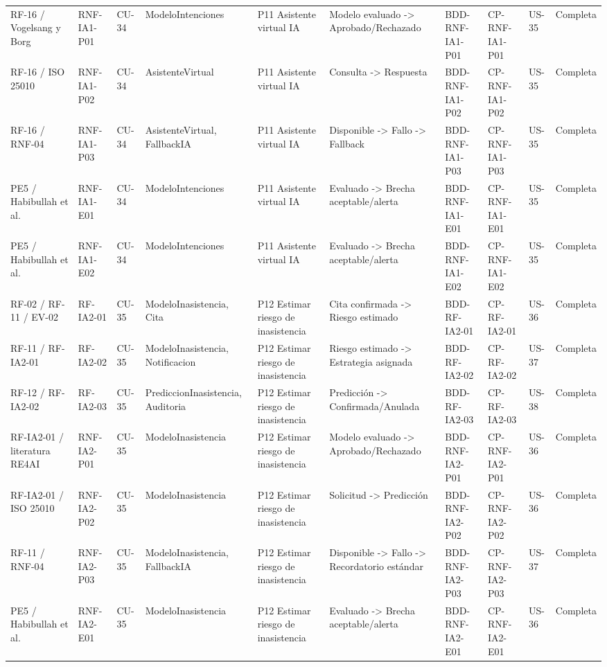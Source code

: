 \documentclass[11pt,a4paper]{article}
\begin{document}
\begin{appendices}
\begin{landscape}
\begin{longtable}{p{2.2cm}p{1.8cm}p{2cm}p{3cm}p{3cm}p{3cm}p{2cm}p{2cm}p{2cm}p{1.6cm}}
				RF-16 / Vogelsang y Borg & RNF-IA1-P01 & CU-34 & ModeloIntenciones & P11 Asistente virtual IA & Modelo evaluado -> Aprobado/Rechazado & BDD-RNF-IA1-P01 & CP-RNF-IA1-P01 & US-35 & Completa\\
				RF-16 / ISO 25010 & RNF-IA1-P02 & CU-34 & AsistenteVirtual & P11 Asistente virtual IA & Consulta -> Respuesta & BDD-RNF-IA1-P02 & CP-RNF-IA1-P02 & US-35 & Completa\\
				RF-16 / RNF-04 & RNF-IA1-P03 & CU-34 & AsistenteVirtual, FallbackIA & P11 Asistente virtual IA & Disponible -> Fallo -> Fallback & BDD-RNF-IA1-P03 & CP-RNF-IA1-P03 & US-35 & Completa\\
				PE5 / Habibullah et al. & RNF-IA1-E01 & CU-34 & ModeloIntenciones & P11 Asistente virtual IA & Evaluado -> Brecha aceptable/alerta & BDD-RNF-IA1-E01 & CP-RNF-IA1-E01 & US-35 & Completa\\
				PE5 / Habibullah et al. & RNF-IA1-E02 & CU-34 & ModeloIntenciones & P11 Asistente virtual IA & Evaluado -> Brecha aceptable/alerta & BDD-RNF-IA1-E02 & CP-RNF-IA1-E02 & US-35 & Completa\\
				RF-02 / RF-11 / EV-02 & RF-IA2-01 & CU-35 & ModeloInasistencia, Cita & P12 Estimar riesgo de inasistencia & Cita confirmada -> Riesgo estimado & BDD-RF-IA2-01 & CP-RF-IA2-01 & US-36 & Completa\\
				RF-11 / RF-IA2-01 & RF-IA2-02 & CU-35 & ModeloInasistencia, Notificacion & P12 Estimar riesgo de inasistencia & Riesgo estimado -> Estrategia asignada & BDD-RF-IA2-02 & CP-RF-IA2-02 & US-37 & Completa\\
				RF-12 / RF-IA2-02 & RF-IA2-03 & CU-35 & PrediccionInasistencia, Auditoria & P12 Estimar riesgo de inasistencia & Predicción -> Confirmada/Anulada & BDD-RF-IA2-03 & CP-RF-IA2-03 & US-38 & Completa\\
				RF-IA2-01 / literatura RE4AI & RNF-IA2-P01 & CU-35 & ModeloInasistencia & P12 Estimar riesgo de inasistencia & Modelo evaluado -> Aprobado/Rechazado & BDD-RNF-IA2-P01 & CP-RNF-IA2-P01 & US-36 & Completa\\
				RF-IA2-01 / ISO 25010 & RNF-IA2-P02 & CU-35 & ModeloInasistencia & P12 Estimar riesgo de inasistencia & Solicitud -> Predicción & BDD-RNF-IA2-P02 & CP-RNF-IA2-P02 & US-36 & Completa\\
				RF-11 / RNF-04 & RNF-IA2-P03 & CU-35 & ModeloInasistencia, FallbackIA & P12 Estimar riesgo de inasistencia & Disponible -> Fallo -> Recordatorio estándar & BDD-RNF-IA2-P03 & CP-RNF-IA2-P03 & US-37 & Completa\\
				PE5 / Habibullah et al. & RNF-IA2-E01 & CU-35 & ModeloInasistencia & P12 Estimar riesgo de inasistencia & Evaluado -> Brecha aceptable/alerta & BDD-RNF-IA2-E01 & CP-RNF-IA2-E01 & US-36 & Completa\\

\end{longtable}
\end{landscape}
\end{appendices}
\end{document}
